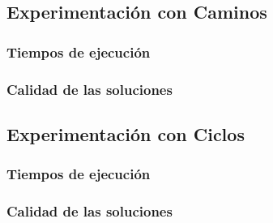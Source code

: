 \subsection{Experimentación con Caminos}
\subsubsection{Tiempos de ejecución}

\subsubsection{Calidad de las soluciones}

\subsection{Experimentación con Ciclos}
\subsubsection{Tiempos de ejecución}

\subsubsection{Calidad de las soluciones}
